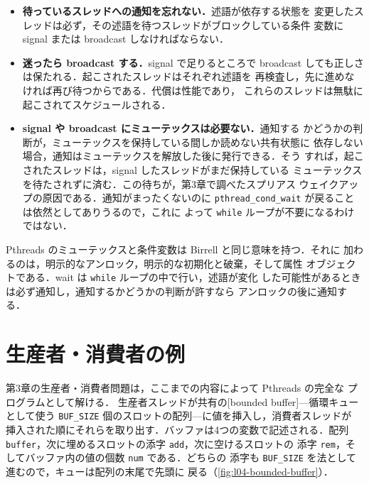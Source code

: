 \documentclass[../main.tex]{subfiles}
\begin{document}
\begin{itemize}
  \item \textbf{待っているスレッドへの通知を忘れない．}述語が依存する状態を
    変更したスレッドは必ず，その述語を待つスレッドがブロックしている条件
    変数に signal または broadcast しなければならない．
  \item \textbf{迷ったら broadcast する．}signal で足りるところで
    broadcast しても正しさは保たれる．起こされたスレッドはそれぞれ述語を
    再検査し，先に進めなければ再び待つからである．代償は性能であり，
    これらのスレッドは無駄に起こされてスケジュールされる．%
  \item \textbf{signal や broadcast にミューテックスは必要ない．}通知する
    かどうかの判断が，ミューテックスを保持している間しか読めない共有状態に
    依存しない場合，通知はミューテックスを解放した後に発行できる．そう
    すれば，起こされたスレッドは，signal したスレッドがまだ保持している
    ミューテックスを待たされずに済む．この待ちが，第3章で調べたスプリアス
    ウェイクアップの原因である．通知がまったくないのに
    \texttt{pthread\_cond\_wait} が戻ることは依然としてありうるので，これに
    よって \texttt{while} ループが不要になるわけではない．
\end{itemize}

\begin{keypoint}
  Pthreads のミューテックスと条件変数は Birrell と同じ意味を持つ．それに
  加わるのは，明示的なアンロック，明示的な初期化と破棄，そして属性
  オブジェクトである．wait は \texttt{while} ループの中で行い，述語が変化
  した可能性があるときは必ず通知し，通知するかどうかの判断が許すなら
  アンロックの後に通知する．
\end{keypoint}

\section{生産者・消費者の例}
\label{sec:l04-prodcons}

第3章の生産者・消費者問題は，ここまでの内容によって Pthreads の完全な
プログラムとして解ける．%
生産者スレッドが共有の[bounded buffer]---循環キューとして使う
\texttt{BUF\_SIZE} 個のスロットの配列---に値を挿入し，消費者スレッドが
挿入された順にそれらを取り出す．バッファは4つの変数で記述される．配列
\texttt{buffer}，次に埋めるスロットの添字 \texttt{add}，次に空けるスロットの
添字 \texttt{rem}，そしてバッファ内の値の個数 \texttt{num} である．どちらの
添字も \texttt{BUF\_SIZE} を法として進むので，キューは配列の末尾で先頭に
戻る（\cref{fig:l04-bounded-buffer}）．
\end{document}
